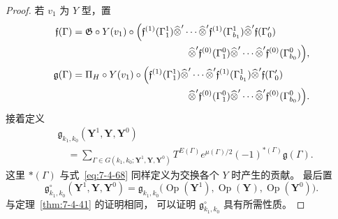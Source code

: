 \begin{proof}
若 $v_1$ 为 $Y$ 型，置
\[
\begin{aligned}
\mathfrak f(\Gamma)
={}&
\mathfrak G\circ Y(v_1)
\circ\Bigl(
\mathfrak f^{(1)}(\Gamma^1_1)
\widehat\otimes'\cdots\widehat\otimes'
\mathfrak f^{(1)}(\Gamma^1_{b_1})
\widehat\otimes'\mathfrak f(\Gamma'_0)\\
&\hspace{37mm}{}
\widehat\otimes'\mathfrak f^{(0)}(\Gamma^0_1)
\widehat\otimes'\cdots\widehat\otimes'
\mathfrak f^{(0)}(\Gamma^0_{b_0})
\Bigr),\\
\mathfrak g(\Gamma)
={}&
\Pi_H\circ Y(v_1)
\circ\Bigl(
\mathfrak f^{(1)}(\Gamma^1_1)
\widehat\otimes'\cdots\widehat\otimes'
\mathfrak f^{(1)}(\Gamma^1_{b_1})
\widehat\otimes'\mathfrak f(\Gamma'_0)\\
&\hspace{37mm}{}
\widehat\otimes'\mathfrak f^{(0)}(\Gamma^0_1)
\widehat\otimes'\cdots\widehat\otimes'
\mathfrak f^{(0)}(\Gamma^0_{b_0})
\Bigr).
\end{aligned}
\]
接着定义
\[
\begin{aligned}
&\mathfrak g_{k_1,k_0}
(\mathbf Y^1,\mathbf Y,\mathbf Y^0)\\
&\quad=
\sum_{\Gamma\in
G(k_1,k_0;\mathbf Y^1,\mathbf Y,\mathbf Y^0)}
T^{E(\Gamma)}e^{\mu(\Gamma)/2}
(-1)^{*(\Gamma)}
\mathfrak g(\Gamma).
\end{aligned}
\]
这里 $*(\Gamma)$ 与式~\eqref{eq:7-4-68}
同样定义为交换各个 $Y$ 时产生的贡献。
最后置
\[
\mathfrak g^\circ_{k_1,k_0}
(\mathbf Y^1,\mathbf Y,\mathbf Y^0)
=
\mathfrak g_{k_1,k_0}
\bigl(
\operatorname{Op}(\mathbf Y^1),
\operatorname{Op}(\mathbf Y),
\operatorname{Op}(\mathbf Y^0)
\bigr).
\]
与定理~\ref{thm:7-4-41} 的证明相同，
可以证明
$\mathfrak g^\circ_{k_1,k_0}$
具有所需性质。
\end{proof}

